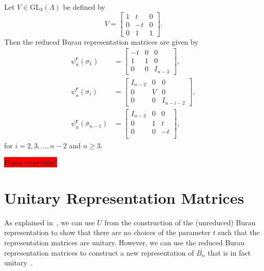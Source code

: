 Let $V\in\textrm{GL}_{3}(\Lambda)$ be defined by
\begin{equation}
    V = \begin{bmatrix}
        1 & t & 0 \\
        0 & -t & 0 \\
        0 & 1 & 1
    \end{bmatrix}.
\end{equation}
Then the reduced Burau representation matrices are given by
\begin{align}
    \psi_n^\textbf{r}(\sigma_1) &= \begin{bmatrix}
        -t & 0 & 0 \\
        1 & 1 & 0 \\
        0 & 0 & I_{n-3}
    \end{bmatrix}, \\
    \psi_n^\textbf{r}(\sigma_i) &= \begin{bmatrix}
        I_{n-2} & 0 & 0 \\
        0 & V & 0 \\
        0 & 0 & I_{n-i-2}
    \end{bmatrix}, \\
    \psi_n^\textbf{r}(\sigma_{n-1}) &= \begin{bmatrix}
        I_{n-3} & 0 & 0 \\
        0 & 1 & t \\
        0 & 0 & -t \\
    \end{bmatrix},
\end{align}
for $i=2,3,\dots,n-2$ and $n\geq 3$.

\colorbox{red}{Prove invertible?}

\section{Unitary Representation Matrices}
As explained in~\cite{Delaney2016}, we can use $U$ from the construction of the (unreduced) Burau representation to show that there are no choices of the parameter $t$ such that the representation matrices are unitary. However, we can use the reduced Burau representation matrices to construct a new representation of $B_n$ that is in fact unitary~\cite{Delaney2016,Squier1984}.


